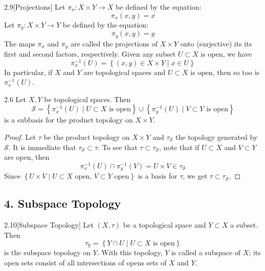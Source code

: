 \begin{customdefinition}{2.9}[Projections]
Let $\pi_x: X \times Y \longrightarrow X$ be defined by the equation:
$$\pi_x(x,y) = x$$
Let $\pi_y: X \times Y \longrightarrow Y$ be defined by the equation:
$$\pi_y(x,y) = y$$
The maps $\pi_x$ and $\pi_y$ are called the projections of $X \times Y$ onto (surjective) its its first and second factors, respectively. Given any subset $U \subset X$ is open, we have
$$\pi_x^{-1}(U) = \left\{(x, y) \in X\times Y \mid x\in U\right\}$$
In particular, if $X$ and $Y$ are topological spaces and $U\subset X$ is open, then so too is $\pi_x^{-1}(U)$.
\end{customdefinition}

\begin{customthm}{2.6}
Let $X, Y$ be topological spaces. Then 
$$\mathcal{S} = \left\{\pi_x^{-1}(U) \mid U\subset X \text{ is open}\right\} \cup \left\{\pi_y^{-1}(U) \mid V\subset Y \text{ is open}\right\}$$
is a subbasis for the product topology on $X \times Y$.
\end{customthm}

\newpage

\begin{proof}
Let $\tau$ be the product topology on $X \times Y$ and $\tau_{\mathcal{S}}$ the topology generated by $\mathcal{S}$. It is immediate that $\tau_{\mathcal{S}} \subset \tau$. To see that $\tau \subset \tau_{\mathcal{S}}$, note that if $U \subset X$ and $V \subset Y$ are open, then 
$$\pi_x^{-1}(U) \cap \pi_y^{-1}(V) = U \times V \in \tau_{\mathcal{S}}$$
Since $\left\{U \times V \mid U \subset X \text{ open, } V \subset Y \text{ open}\right\}$ is a basis for $\tau$, we get $\tau \subset \tau_{\mathcal{S}}$.
\end{proof}

\subsection*{4. Subspace Topology}

\begin{customdefinition}{2.10}[Subspace Topology]
Let $(X, \tau)$ be a topological space and $Y \subset X$ a subset. Then 
$$\tau_Y = \left\{Y \cap U \mid U \subset X \text{ is open}\right\}$$
is the subspace topology on $Y$. With this topology, $Y$ is called a subspace of $X$; its open sets consist of all intersections of opens sets of $X$ and $Y$.
\end{customdefinition}

